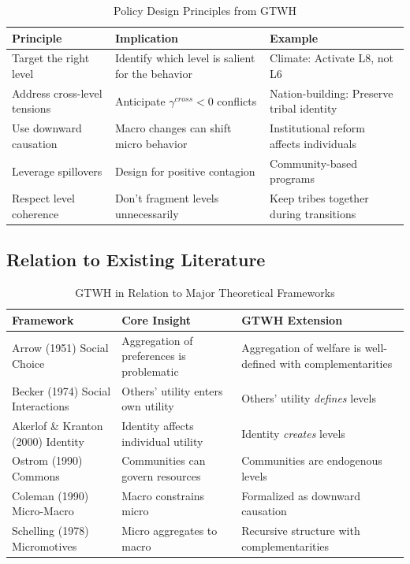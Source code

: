 \begin{table}[htbp]
\centering
\caption{Policy Design Principles from GTWH}
\label{tab:gtwh-policy}
\renewcommand{\arraystretch}{1.4}
\begin{tabular}{@{}p{4cm}p{5cm}p{5cm}@{}}
\toprule
\textbf{Principle} & \textbf{Implication} & \textbf{Example} \\
\midrule
Target the right level & Identify which level is salient for the behavior & Climate: Activate L8, not L6 \\
Address cross-level tensions & Anticipate $\gamma^{cross} < 0$ conflicts & Nation-building: Preserve tribal identity \\
Use downward causation & Macro changes can shift micro behavior & Institutional reform affects individuals \\
Leverage spillovers & Design for positive contagion & Community-based programs \\
Respect level coherence & Don't fragment levels unnecessarily & Keep tribes together during transitions \\
\bottomrule
\end{tabular}
\end{table}

\subsection{Relation to Existing Literature}

\begin{table}[htbp]
\centering
\caption{GTWH in Relation to Major Theoretical Frameworks}
\label{tab:gtwh-literature}
\renewcommand{\arraystretch}{1.4}
\small
\begin{tabular}{@{}p{3.5cm}p{4cm}p{6cm}@{}}
\toprule
\textbf{Framework} & \textbf{Core Insight} & \textbf{GTWH Extension} \\
\midrule
Arrow (1951) Social Choice & Aggregation of preferences is problematic & Aggregation of welfare is well-defined with complementarities \\
Becker (1974) Social Interactions & Others' utility enters own utility & Others' utility \textit{defines} levels \\
Akerlof \& Kranton (2000) Identity & Identity affects individual utility & Identity \textit{creates} levels \\
Ostrom (1990) Commons & Communities can govern resources & Communities are endogenous levels \\
Coleman (1990) Micro-Macro & Macro constrains micro & Formalized as downward causation \\
Schelling (1978) Micromotives & Micro aggregates to macro & Recursive structure with complementarities \\
\bottomrule
\end{tabular}
\end{table}

